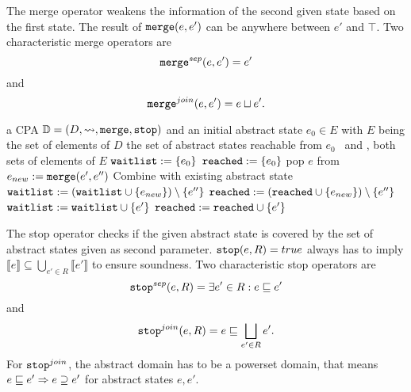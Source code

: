 The merge operator weakens the information of the second given state based on the first state. The result of $\texttt{merge}(e, e')$ can be anywhere between $e'$ and $\top$.
Two characteristic merge operators are \[\texttt{merge}^{sep}(e, e') = e'\] and \[\texttt{merge}^{join}(e, e') = e \sqcup e'.\]
\begin{algorithm}[t]
\caption{$CPA(\cpa, e_0)$}
\label{alg:CPA}
\begin{algorithmic}[1]

\Input a CPA $\mathbb{D} = (D, \rightsquigarrow, \texttt{merge}, \texttt{stop})$ 
	    and an initial abstract state $e_0 \in E$ with $E$ being the set of elements of $D$
\Output the set of abstract states reachable from $e_0$
\Variables \reachedSet\ and \waitlistSet , both sets of elements of $E$
\State $\texttt{waitlist} := \{e_0\}$
\State $\texttt{reached} := \{e_0\}$
\While{$\waitlistSet \neq \varnothing$}
	\State pop $e$ from \waitlistSet
		 \label{alg:cpa:mergeStart}
			\State $e_{new} := \texttt{merge}(e', e'')$ \Comment Combine with existing abstract state
				\State $\texttt{waitlist} := (\texttt{waitlist} \cup \{ e_{new} \}) \setminus \{ e'' \}$
				\State $\texttt{reached} := (\texttt{reached} \cup \{ e_{new} \}) \setminus \{ e'' \}$
			\EndIf
		\EndFor \label{alg:cpa:mergeStop}
		 \label{alg:cpa:stopCheck}
			\State $\texttt{waitlist} := \texttt{waitlist} \cup \{e'\}$
			\State $\texttt{reached} := \texttt{reached} \cup \{e'\}$
		\EndIf
	\EndFor
\EndWhile\\ 
\Return \reachedSet
\end{algorithmic}
\end{algorithm}

The stop operator checks if the given abstract state is covered by the set of abstract states given as second parameter.
$\texttt{stop}(e, R) = true$ always has to imply $\llbracket e \rrbracket \subseteq \bigcup_{e' \in R} \llbracket e' \rrbracket$ to ensure soundness.
Two characteristic stop operators are \[\texttt{stop}^{sep}(e, R) = \exists e' \in R : e \sqsubseteq e'\] and \[\texttt{stop}^{join}(e, R) = e \sqsubseteq \bigsqcup_{e' \in R} e'.\]
For $\texttt{stop}^{join}$, the abstract domain has to be a powerset domain, that means $e \sqsubseteq e' \Rightarrow e \supseteq e'$ for abstract states $e, e'$.

